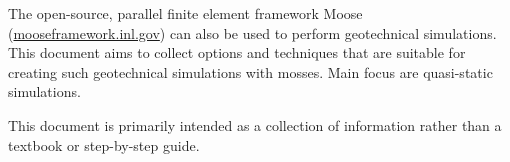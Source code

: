 The open-source, parallel finite element framework Moose
(\url{mooseframework.inl.gov}) can also be used to perform geotechnical
simulations. This document aims to collect options and techniques that are
suitable for creating such geotechnical simulations with mosses. Main focus are
quasi-static simulations.

This document is primarily intended as a collection of information rather than
a textbook or step-by-step guide.
